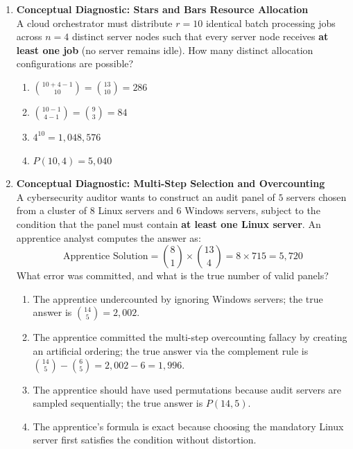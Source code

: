 \begin{enumerate}[resume]
\item \textbf{Conceptual Diagnostic: Stars and Bars Resource Allocation} \\
A cloud orchestrator must distribute $r = 10$ identical batch processing jobs across $n = 4$ distinct server nodes such that every server node receives \textbf{at least one job} (no server remains idle). How many distinct allocation configurations are possible?
\begin{enumerate}
    \item $\binom{10 + 4 - 1}{10} = \binom{13}{10} = 286$
    \item $\binom{10 - 1}{4 - 1} = \binom{9}{3} = 84$
    \item $4^{10} = 1{,}048{,}576$
    \item $P(10, 4) = 5{,}040$
\end{enumerate}

\item \textbf{Conceptual Diagnostic: Multi-Step Selection and Overcounting} \\
A cybersecurity auditor wants to construct an audit panel of $5$ servers chosen from a cluster of $8$ Linux servers and $6$ Windows servers, subject to the condition that the panel must contain \textbf{at least one Linux server}. An apprentice analyst computes the answer as:
$$\text{Apprentice Solution} = \binom{8}{1} \times \binom{13}{4} = 8 \times 715 = 5{,}720$$
What error was committed, and what is the true number of valid panels?
\begin{enumerate}
    \item The apprentice undercounted by ignoring Windows servers; the true answer is $\binom{14}{5} = 2{,}002$.
    \item The apprentice committed the multi-step overcounting fallacy by creating an artificial ordering; the true answer via the complement rule is $\binom{14}{5} - \binom{6}{5} = 2{,}002 - 6 = 1{,}996$.
    \item The apprentice should have used permutations because audit servers are sampled sequentially; the true answer is $P(14, 5)$.
    \item The apprentice's formula is exact because choosing the mandatory Linux server first satisfies the condition without distortion.
\end{enumerate}
\end{enumerate}
